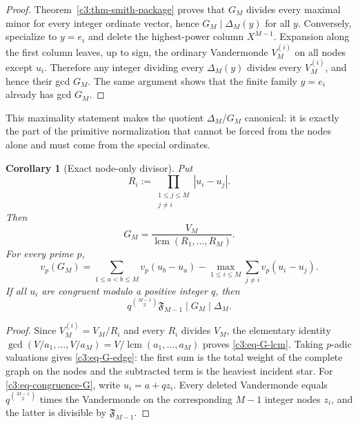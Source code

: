 \documentclass[11pt,oneside]{article}
\newtheorem{corollary}[theorem]{Corollary}
\theoremstyle{definition}
\theoremstyle{remark}
\newcommand{\SF}[1]{\mathfrak F_{#1}}
\begin{document}
\begin{proof}
Theorem~\ref{c3:thm-smith-package} proves that $G_M$ divides every maximal minor for every
integer ordinate vector, hence $G_M\mid\Delta_M(y)$ for all $y$.  Conversely, specialize to
$y=e_i$ and delete the highest-power column $X^{M-1}$.  Expansion along the first column
leaves, up to sign, the ordinary Vandermonde $V_M^{(i)}$ on all nodes except $u_i$.
Therefore any integer dividing every $\Delta_M(y)$ divides every $V_M^{(i)}$, and hence their
gcd $G_M$.  The same argument shows that the finite family $y=e_i$ already has gcd $G_M$.
\end{proof}

This maximality statement makes the quotient $\Delta_M/G_M$ canonical: it is exactly the
part of the primitive normalization that cannot be forced from the nodes alone and must come
from the special ordinates.

\begin{corollary}[Exact node-only divisor]
\label{c3:cor-node-divisor}
Put
\[
 R_i:=\prod_{\substack{1\le j\le M\\j\ne i}}|u_i-u_j|.
\]
Then
\begin{equation}
 G_M=\frac{V_M}{\operatorname{lcm}(R_1,\ldots,R_M)}.
 \label{c3:eq-G-lcm}
\end{equation}
For every prime $p$,
\begin{equation}
 v_p(G_M)=
 \sum_{1\le a<b\le M}v_p(u_b-u_a)
 -\max_{1\le i\le M}\sum_{j\ne i}v_p(u_i-u_j).
 \label{c3:eq-G-edge}
\end{equation}
If all $u_i$ are congruent modulo a positive integer $q$, then
\begin{equation}
 q^{\binom{M-1}{2}}\SF{M-1}\mid G_M\mid\Delta_M.
 \label{c3:eq-congruence-G}
\end{equation}
\end{corollary}

\begin{proof}
Since $V_M^{(i)}=V_M/R_i$ and every $R_i$ divides $V_M$, the elementary identity
$\gcd(V/a_1,\ldots,V/a_M)=V/\operatorname{lcm}(a_1,\ldots,a_M)$ proves
\eqref{c3:eq-G-lcm}.  Taking $p$-adic valuations gives \eqref{c3:eq-G-edge}: the first sum is
the total weight of the complete graph on the nodes and the subtracted term is the heaviest
incident star.  For \eqref{c3:eq-congruence-G}, write $u_i=a+qz_i$.  Every deleted
Vandermonde equals $q^{\binom{M-1}{2}}$ times the Vandermonde on the corresponding $M-1$
integer nodes $z_i$, and the latter is divisible by $\SF{M-1}$.
\end{proof}
\end{document}
